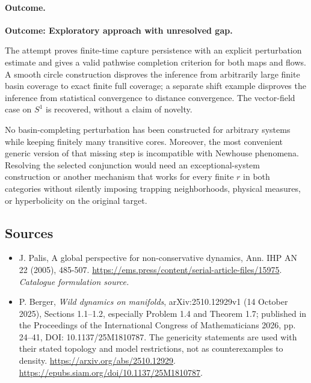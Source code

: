 \documentclass[11pt,a4paper]{article}
\begin{document}
\paragraph{Outcome.}
\textbf{Outcome: Exploratory approach with unresolved gap.}

The attempt proves finite-time capture persistence with an explicit
perturbation estimate and gives a valid pathwise completion criterion
for both maps and flows. A smooth circle construction disproves the
inference from arbitrarily large finite basin coverage to exact finite
full coverage; a separate shift example disproves the inference from
statistical convergence to distance convergence. The vector-field case
on $S^1$ is recovered, without a claim of novelty.

No basin-completing perturbation has been constructed for arbitrary
systems while keeping finitely many transitive cores. Moreover, the
most convenient generic version of that missing step is incompatible
with Newhouse phenomena. Resolving the selected conjunction would need
an exceptional-system construction or another mechanism that works
for every finite $r$ in both categories without silently imposing
trapping neighborhoods, physical measures, or hyperbolicity on the
original target.

\subsection{Sources}
\begin{itemize}\raggedright
\item[\textnormal{[S1]}]\hypertarget{source:205:1}{} J. Palis, A global perspective for non-conservative dynamics, Ann. IHP AN 22 (2005), 485-507.
\url{https://ems.press/content/serial-article-files/15975}.
{\small\textit{Catalogue formulation source.}}
\item[\textnormal{[E1]}]\hypertarget{extra:205:1}{}
P. Berger, \emph{Wild dynamics on manifolds}, arXiv:2510.12929v1
(14 October 2025), Sections 1.1--1.2, especially Problem 1.4 and
Theorem 1.7; published in the Proceedings of the International Congress
of Mathematicians 2026, pp. 24--41, DOI: 10.1137/25M1810787.
The genericity statements are used with their stated topology and
model restrictions, not as counterexamples to density.
\url{https://arxiv.org/abs/2510.12929}.
\url{https://epubs.siam.org/doi/10.1137/25M1810787}.
\end{itemize}
\end{document}
